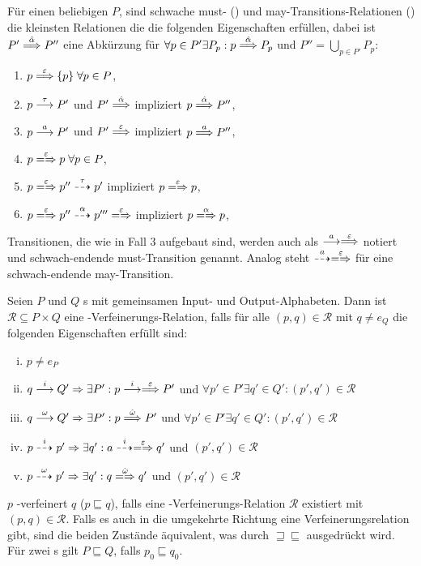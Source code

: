 \begin{Def}
  Für einen beliebigen \MEIO{} $P$, sind schwache must- (\weakmust) und
  may-Transitions-Relationen (\weakmay) die kleinsten Relationen die die
  folgenden Eigenschaften erfüllen, dabei ist $P'\weakmust[\hat{\alpha}]P''$
  eine Abkürzung für $\forall p\in P'\exists P_p:p\weakmust[\hat{\alpha}]P_p$
  und $P''=\underset{p\in P'}{\bigcup}P_p$:
  \begin{enumerate}
    \item $p\weakmust[\varepsilon]\{p\}\; \forall p\in P$,
    \item $p\must[\tau]P'$ und $P'\weakmust[\hat{\alpha}]$ impliziert
      $p\weakmust[\hat{\alpha}]P''$,
    \item $p\must[a]P'$ und $P'\weakmust[\varepsilon]$ impliziert
      $p\weakmust[a]P''$,
    \item $p\weakmay[\varepsilon]p\; \forall p\in P$,
    \item $p\weakmay[\varepsilon]p''\may[\tau]p'$ impliziert
      $p\weakmay[\varepsilon]p$,
    \item $p\weakmay[\varepsilon]p''\may[\alpha]p'''\weakmay[\varepsilon]$
      impliziert $p\weakmay[\alpha]p$,
  \end{enumerate}

  Transitionen, die wie in Fall 3 aufgebaut sind, werden auch als
  $\must[a]\weakmust[\varepsilon]$ notiert und schwach-endende must-Transition
   genannt. Analog steht
  $\may[a]\weakmay[\varepsilon]$ für eine schwach-endende may-Transition.
\end{Def}

\begin{Def}
  Seien $P$ und $Q$ \MIA{}s mit gemeinsamen Input- und Output-Alphabeten. Dann
  ist $\mathcal{R}\subseteq P\times Q$ eine \MIA{}-Verfeinerungs-Relation,
  falls für alle $(p,q)\in\mathcal{R}$ mit $q\neq e_Q$ die folgenden
  Eigenschaften erfüllt sind:
  \begin{enumerate}[(i)]
    \item $p\neq e_P$
    \item $q\must[i]Q'\Rightarrow\exists P': p\must[i]\weakmust[\varepsilon]
      P'$ und $\forall p'\in P'\exists q'\in Q':(p',q')\in\mathcal{R}$
    \item $q\must[\omega]Q'\Rightarrow\exists P': p\weakmust[\hat{\omega}]
      P'$ und $\forall p'\in P'\exists q'\in Q':(p',q')\in\mathcal{R}$
    \item $p\may[i]p'\Rightarrow\exists q': a\may[i]\weakmay[\varepsilon]
      q'$ und $(p',q')\in\mathcal{R}$
    \item $p\may[\omega]p'\Rightarrow\exists q': q\weakmay[\hat{\omega}]
      q'$ und $(p',q')\in\mathcal{R}$
  \end{enumerate}
  $p$ \MIA{}-verfeinert $q$ ($p\sqsubseteq q$), falls eine
  \MIA{}-Verfeinerungs-Relation $\mathcal{R}$ existiert mit
  $(p,q)\in\mathcal{R}$. Falls es auch in die umgekehrte Richtung eine
  Verfeinerungsrelation gibt, sind die beiden Zustände äquivalent, was durch
  $\sqsupseteq\sqsubseteq$ ausgedrückt wird. Für zwei \MIA{}s gilt $P\sqsubseteq Q$, falls
  $p_0\sqsubseteq q_0$.
\end{Def}
